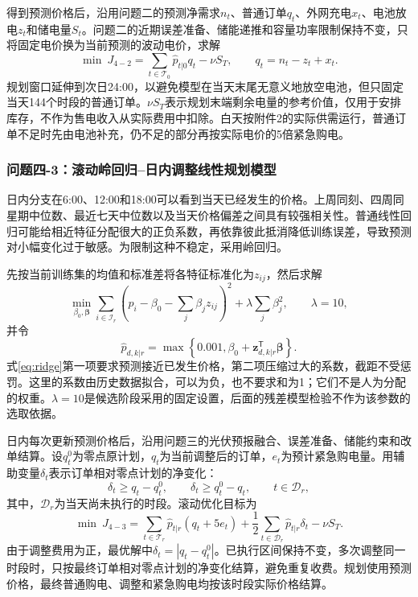得到预测价格后，沿用问题二的预测净需求$n_t$、普通订单$q_t$、外网充电$x_t$、电池放电$z_t$和储电量$S_t$。问题二的近期误差准备、储能递推和容量功率限制保持不变，只将固定电价换为当前预测的波动电价，求解
\begin{equation}
 \min\ J_{4-2}=\sum_{t\in\mathcal T_0}\widehat p_{t|0}q_t-\nu S_T,
 \qquad q_t=n_t-z_t+x_t.
 \label{eq:q42lp}
\end{equation}
规划窗口延伸到次日24:00，以避免模型在当天末尾无意义地放空电池，但只固定当天144个时段的普通订单。$\nu S_T$表示规划末端剩余电量的参考价值，仅用于安排库存，不作为售电收入从实际费用中扣除。白天按附件2的实际供需运行，普通订单不足时先由电池补充，仍不足的部分再按实际电价的5倍紧急购电。

\subsubsection{问题四-3：滚动岭回归--日内调整线性规划模型}

日内分支在6:00、12:00和18:00可以看到当天已经发生的价格。上周同刻、四周同星期中位数、最近七天中位数以及当天价格偏差之间具有较强相关性。普通线性回归可能给相近特征分配很大的正负系数，再依靠彼此抵消降低训练误差，导致预测对小幅变化过于敏感。为限制这种不稳定，采用岭回归。

先按当前训练集的均值和标准差将各特征标准化为$z_{ij}$，然后求解
\begin{equation}
 \min_{\beta_0,\boldsymbol\beta}
 \sum_{i\in\mathcal I_r}\left(p_i-\beta_0-\sum_j\beta_jz_{ij}\right)^2
 +\lambda\sum_j\beta_j^2,
 \qquad \lambda=10,
 \label{eq:ridge}
\end{equation}
并令
\begin{equation}
 \widehat p_{d,k|r}=\max\left\{0.001,\beta_0+
 \boldsymbol z_{d,k|r}^{\mathsf T}\boldsymbol\beta\right\}.
 \label{eq:ridgepredict}
\end{equation}
式\eqref{eq:ridge}第一项要求预测接近已发生价格，第二项压缩过大的系数，截距不受惩罚。这里的系数由历史数据拟合，可以为负，也不要求和为1；它们不是人为分配的权重。$\lambda=10$是候选阶段采用的固定设置，后面的残差模型检验不作为该参数的选取依据。

日内每次更新预测价格后，沿用问题三的光伏预报融合、误差准备、储能约束和改单结算。设$q_t^0$为零点原计划，$q_t$为当前调整后的订单，$e_t$为预计紧急购电量。用辅助变量$\delta_t$表示订单相对零点计划的净变化：
\begin{equation}
 \delta_t\ge q_t-q_t^0,\qquad \delta_t\ge q_t^0-q_t,
 \qquad t\in\mathcal D_r,
 \label{eq:delta}
\end{equation}
其中，$\mathcal D_r$为当天尚未执行的时段。滚动优化目标为
\begin{equation}
 \min\ J_{4-3}=\sum_{t\in\mathcal T_r}\widehat p_{t|r}(q_t+5e_t)
 +\frac12\sum_{t\in\mathcal D_r}\widehat p_{t|r}\delta_t-\nu S_T.
 \label{eq:q43lp}
\end{equation}
由于调整费用为正，最优解中$\delta_t=|q_t-q_t^0|$。已执行区间保持不变，多次调整同一时段时，只按最终订单相对零点计划的净变化结算，避免重复收费。规划使用预测价格，最终普通购电、调整和紧急购电均按该时段实际价格结算。

